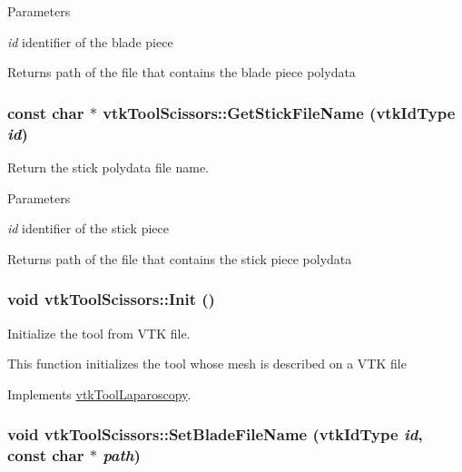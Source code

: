 \begin{DoxyParams}{Parameters}
\item[{\em id}]identifier of the blade piece \end{DoxyParams}
\begin{DoxyReturn}{Returns}
path of the file that contains the blade piece polydata 
\end{DoxyReturn}
\hypertarget{classvtkToolScissors_ac99cbf90a47faba5527d4941688c7067}{
\subsubsection[{GetStickFileName}]{\setlength{\rightskip}{0pt plus 5cm}const char $\ast$ vtkToolScissors::GetStickFileName (vtkIdType {\em id})}}
\label{classvtkToolScissors_ac99cbf90a47faba5527d4941688c7067}


Return the stick polydata file name. 


\begin{DoxyParams}{Parameters}
\item[{\em id}]identifier of the stick piece \end{DoxyParams}
\begin{DoxyReturn}{Returns}
path of the file that contains the stick piece polydata 
\end{DoxyReturn}
\hypertarget{classvtkToolScissors_a5fc5884ce0fd1723ecf86888bdbba7a6}{
\subsubsection[{Init}]{\setlength{\rightskip}{0pt plus 5cm}void vtkToolScissors::Init ()}}
\label{classvtkToolScissors_a5fc5884ce0fd1723ecf86888bdbba7a6}


Initialize the tool from VTK file. 

This function initializes the tool whose mesh is described on a VTK file 

Implements \hyperlink{classvtkToolLaparoscopy_ace75ea21a3ddb27547976ddea0ebb60e}{vtkToolLaparoscopy}.

\hypertarget{classvtkToolScissors_a7d769a793faf2cefaf2fd869a7d4d1e3}{
\subsubsection[{SetBladeFileName}]{\setlength{\rightskip}{0pt plus 5cm}void vtkToolScissors::SetBladeFileName (vtkIdType {\em id}, \/  const char $\ast$ {\em path})}}
\label{classvtkToolScissors_a7d769a793faf2cefaf2fd869a7d4d1e3}


